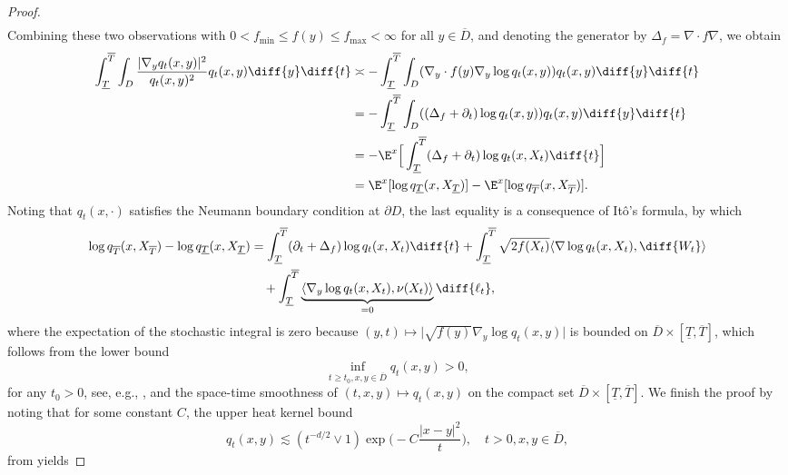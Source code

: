 \documentclass[a4paper, 11pt, headings = small, abstract]{scrartcl}
\begin{document}
\begin{proof}
\begin{align*}
\end{align*}
Combining these two observations with $0 < f_{\min} \leq f(y) \leq f_{\max} < \infty$ for all $y \in \overline{D}$, and denoting  the generator by $\Delta_f = \nabla \cdot f \nabla $, we obtain
\begin{align*} 
\int_{\underline{T}}^{\overline{T}} \int_{D} \frac{\lvert \nabla_y q_t(x,y) \rvert^2}{q_t(x,y)^2} q_t(x,y) \diff{y} \diff{t} &\asymp -\int_{\underline{T}}^{\overline{T}}  \int_{D} (\nabla_y \cdot f(y)\nabla_y \log q_t(x,y)) q_t(x,y) \diff{y} \diff{t}\\
&= -\int_{\underline{T}}^{\overline{T}} \int_{D} ((\Delta_f + \partial_t) \log q_t(x,y)) q_t(x,y)\diff{y} \diff{t}\\
&= -\E^x\Big[\int_{\underline{T}}^{\overline{T}} (\Delta_f + \partial_t) \log q_t(x, X_t)   \diff{t}\Big] \\
&= \E^x[\log q_{\underline{T}}(x,X_{\underline{T}})] - \E^x[\log q_{\overline{T}}(x,X_{\overline{T}})].
\end{align*}
Noting that $q_t(x,\cdot)$ satisfies the Neumann boundary condition at $\partial{D}$, the last equality is a consequence of Itô's formula, by which 
\begin{align*}
\log q_{\overline{T}}(x,X_{\overline{T}}) - \log q_{\underline{T}}(x,X_{\underline{T}}) &= \int_{\underline{T}}^{\overline{T}} (\partial_t + \Delta_f) \log q_t(x,X_t) \diff{t} + \int_{\underline{T}}^{\overline{T}} \sqrt{2f(X_t)} \langle \nabla \log q_t(x,X_t), \diff{W_t} \rangle\\
&\quad + \int_{\underline{T}}^{\overline{T}} \underbrace{\langle \nabla_y \log q_t(x,X_t), \nu(X_t) \rangle}_{=0} \diff{\ell_t},
\end{align*}
where the expectation of the stochastic integral is zero because $(y,t) \mapsto \lvert \sqrt{f(y)}\nabla_y \log q_t(x,y)\rvert$ is bounded on $\overline{D}\times [\underline{T}, \overline{T}]$, which follows from the lower bound 
\begin{equation} \label{eq:lower_uni}
\inf_{t \geq t_0, x,y \in \overline{D}} q_t(x,y) > 0, 
\end{equation}
for any $t_0 > 0$, see, e.g., \cite[p.166]{ito92},
and the space-time smoothness of $(t,x,y) \mapsto q_t(x,y)$ on the compact set $\overline{D}\times [\underline{T}, \overline{T}]$. We finish the proof by noting that for some constant $C$, the upper heat kernel bound 
\[q_t(x,y) \lesssim (t^{-d/2} \vee 1) \exp\Big(-C\frac{\lvert x-y \rvert^2}{t}\Big), \quad t > 0, x,y \in \overline{D},\]
from \cite[Theorem 3.29]{davies89} yields 

\end{proof}
\end{document}
